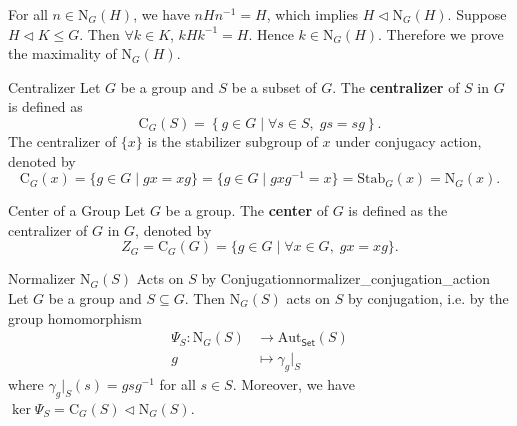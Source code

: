 \begin{prf}
    For all $n\in \mathrm{N}_G(H)$, we have $nHn^{-1}=H$, which implies $H \lhd \mathrm{N}_G(H)$. Suppose $H\lhd K\le G$. Then $\forall k\in K$, $kHk^{-1}=H$. Hence $k\in \mathrm{N}_G(H)$. Therefore we prove the maximality of $\mathrm{N}_G(H)$.
\end{prf}

\begin{definition}{Centralizer}{}
    Let $G$ be a group and $S$ be a subset of $G$. The \textbf{centralizer} of $S$ in $G$ is defined as
    \[
        \mathrm{C}_G(S)=\left\{g\in G\mid  \forall s\in S,\;gs=sg\right\}.
    \]
    The centralizer of $\{x\}$ is the stabilizer subgroup of $x$ under conjugacy action, denoted by
    \[
        \mathrm{C}_G(x)=\{ g\in G\mid gx=xg \}=\{ g\in G\mid gxg^{-1}=x \}= \mathrm{Stab}_G(x)=\mathrm{N}_G(x).
    \]

\end{definition}



\begin{definition}{Center of a Group}{}
    Let $G$ be a group. The \textbf{center} of $G$ is defined as the centralizer of $G$ in $G$, denoted by
    \[
        Z_G=\mathrm{C}_G(G)=\{ g\in G\mid \forall x\in G,\; gx=xg\}.
    \]
\end{definition}



\begin{proposition}{Normalizer $\mathrm{N}_G(S)$ Acts on $S$ by Conjugation}{normalizer_conjugation_action}
    Let $G$ be a group and $S\subseteq G$. Then $\mathrm{N}_G(S)$ acts on $S$ by conjugation, i.e. by the group homomorphism
    \begin{align*}
        \Psi_S: \mathrm{N}_G(S) & \longrightarrow \mathrm{Aut}_{\mathsf{Set}}(S) \\
        g                       & \longmapsto \gamma_g|_S
    \end{align*}
    where $\gamma_g|_S(s)=gsg^{-1}$ for all $s\in S$. Moreover, we have $\ker\Psi_S=\mathrm{C}_G(S)\lhd \mathrm{N}_G(S)$.
\end{proposition}


